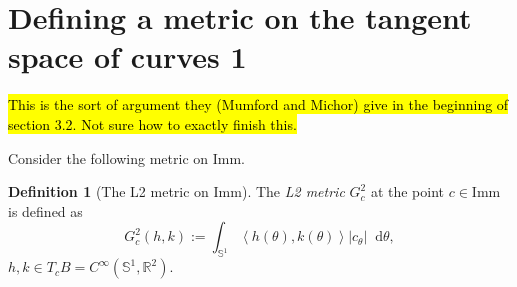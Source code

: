 \documentclass[a4,danish]{article}
\theoremstyle{break}
\theoremstyle{definition}
\newtheorem{definition}[subsection]{Definition}
\theoremstyle{Break}
\newcommand{\R}{\mathbb{R}}
\newcommand{\I}{\text{Imm}}
\renewcommand{\S}{\mathbb{S}}
\newcommand*\diff{\mathop{}\!\mathrm{d}}
\begin{document}
\section*{Defining a metric on the tangent space of curves 1}
\label{sec:defin-metr-tang}

\hl{This is the sort of argument they (Mumford and Michor) give in the
  beginning of section 3.2. Not sure how to exactly finish this.}

Consider the following metric on $\I$.

\begin{definition}[The L2 metric on $\I$]
  The \textit{L2 metric} $G^2_c$ at the point $c \in \I$ is defined as
  \begin{equation*}
    G^2_c(h,k) := \int_{\S^{1}} \left\langle{h(\theta)
    , k(\theta)}\right\rangle |c_{\theta}| \diff \theta,
  \end{equation*}
  $h,k \in T_cB = C^{\infty}(\S^1,\R^2)$.
\end{definition}
\end{document}
